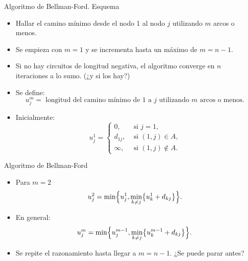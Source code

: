 \documentclass[aspectratio=169]{beamer}
\begin{document}
\begin{frame}{Algoritmo de Bellman-Ford. Esquema}
	\begin{itemize}\itemsep 2mm
		\item Hallar el camino m\'inimo desde el nodo 1 al nodo $j$ utilizando $m$ arcos o menos.
		\item Se empieza con $m=1$ y se incrementa hasta un m\'aximo de $m=n-1$.
		\item Si no hay circuitos de longitud negativa, el algoritmo converge en $n$ iteraciones a lo sumo. (\alert{¿y si los hay?})
		\item Se define:
		$$
		u_j^{m}=\text{ longitud del camino m\'inimo de 1 a $j$ utilizando $m$ arcos o menos.}
		$$
		\item Inicialmente:
		$$
		u_j^1=\begin{cases}
			0, & \text{ si $j=1$,}
			\\[2mm]
			d_{1j}, & \text{ si $(1,j)\in A$,}
			\\[2mm]
			\infty, & \text{ si $(1,j)\notin A$.}
		\end{cases}
		$$
	\end{itemize}
\end{frame}

\begin{frame}{Algoritmo de Bellman-Ford}
	\begin{itemize}\itemsep 5mm
		\item
	Para $m=2$
	$$
	u_j^2=\min\Bigl\{u_j^{1},\min_{k\neq j}\bigl\{u_k^1+d_{kj}\bigr\}\Bigr\}.
	$$
	\item En general:
	$$
	u_j^m=\min\Bigl\{u_j^{m-1},\min_{k\neq j}\bigl\{u_k^{m-1}+d_{kj}\bigr\}\Bigr\}.
	$$	
 \item Se repite el razonamiento hasta llegar a $m=n-1$. \alert{¿Se puede parar antes?}
	\end{itemize}
\end{frame}
\end{document}
